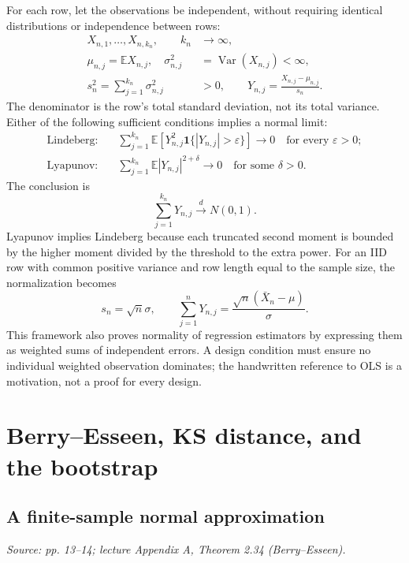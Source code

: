 \documentclass[12pt]{article}
\newcommand{\E}{\mathbb E}
\newcommand{\ind}{\mathbf 1}
\DeclareMathOperator{\Var}{Var}
\begin{document}
For each row, let the observations be independent, without requiring
identical distributions or independence between rows:
\begin{align}
 X_{n,1},\ldots,X_{n,k_n},\qquad k_n&\longrightarrow\infty,\\
 \mu_{n,j}=\E X_{n,j},\quad\sigma_{n,j}^2&=\Var(X_{n,j})<\infty,\\
 s_n^2=\sum_{j=1}^{k_n}\sigma_{n,j}^2&>0,\qquad
 Y_{n,j}=\frac{X_{n,j}-\mu_{n,j}}{s_n}.
\end{align}
The denominator is the row's total standard deviation, not its total
variance. Either of the following sufficient conditions implies a normal
limit:
\begin{align}
 \text{Lindeberg:}\quad&
 \sum_{j=1}^{k_n}\E[Y_{n,j}^2\ind\{|Y_{n,j}|>\varepsilon\}]
 \longrightarrow0\quad\text{for every }\varepsilon>0;\\
 \text{Lyapunov:}\quad&
 \sum_{j=1}^{k_n}\E|Y_{n,j}|^{2+\delta}\longrightarrow0
 \quad\text{for some }\delta>0.
\end{align}
The conclusion is
\begin{equation}
 \sum_{j=1}^{k_n}Y_{n,j}\xrightarrow{d}N(0,1).
\end{equation}
Lyapunov implies Lindeberg because each truncated second moment is bounded
by the higher moment divided by the threshold to the extra power.
For an IID row with common positive variance and row length equal to the
sample size, the normalization becomes
\begin{equation}
 s_n=\sqrt n\sigma,\qquad
 \sum_{j=1}^nY_{n,j}=\frac{\sqrt n(\bar X_n-\mu)}{\sigma}.
\end{equation}
This framework also proves normality of regression estimators by expressing
them as weighted sums of independent errors. A design condition must ensure
no individual weighted observation dominates; the handwritten reference to
OLS is a motivation, not a proof for every design.

\section{Berry--Esseen, KS distance, and the bootstrap}
\subsection{A finite-sample normal approximation}
\textit{Source: pp. 13--14; lecture Appendix A, Theorem 2.34 (Berry--Esseen).}
\end{document}
